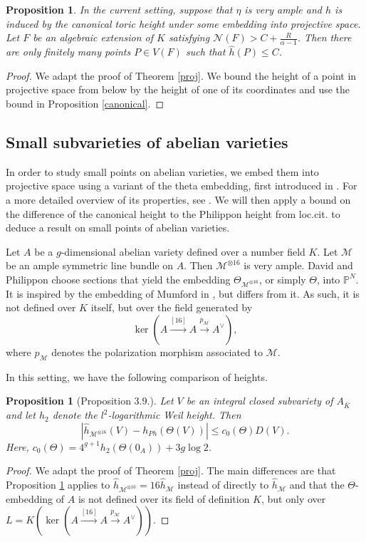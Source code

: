 \documentclass[11pt, a4paper, UKenglish]{amsart}
\newcommand{\N}{\mathcal N}
\newcommand{\sM}{\mathcal{M}}
\newcommand{\bbP}{\mathbb{P}}
\newcommand{\eqn}[1]{\begin{equation*}#1\end{equation*}}
\newtheorem{prop_}[thm_]{Proposition}
\theoremstyle{definition}
\newcommand{\prop}[1]{\begin{prop_}#1\end{prop_}}
\newcommand{\pf}[1]{\begin{proof}#1\end{proof}}
\begin{document}
\prop{In the current setting, suppose that $\eta$ is very ample and $h$ is induced by the canonical toric height under some embedding into projective space. Let $F$ be an algebraic extension of $K$ satisfying $\N(F) > C + \frac{R}{\alpha - 1}$. Then there are only finitely many points $P \in V(F)$ such that $\hat{h}(P) \leq C$.
}

\pf{We adapt the proof of Theorem \ref{proj}. We bound the height of a point in projective space from below by the height of one of its coordinates and use the bound in Proposition \ref{canonical}.}


\subsection{Small subvarieties of abelian varieties}

In order to study small points on abelian varieties, we embed them into projective space using a variant of the theta embedding, first introduced in \cite{mumford}. For a more detailed overview of its properties, see \cite{subvar}. We will then apply a bound on the difference of the canonical height to the Philippon height from loc.cit. to deduce a result on small points of abelian varieties.

Let $A$ be a $g$-dimensional abelian variety defined over a number field $K$. Let $\sM$ be an ample symmetric line bundle on $A$. Then $\sM^{\otimes 16}$ is very ample. David and Philippon choose sections that yield the embedding $\Theta_{\sM^{\otimes 16}}$, or simply $\Theta$, into $\bbP^N$. It is inspired by the embedding of Mumford in \cite{mumford}, but differs from it. As such, it is not defined over $K$ itself, but over the field generated by 
\eqn{\ker\left( A \xrightarrow{[16]}A \xrightarrow{p_{\sM}} A^{\vee}\right),}
where $p_{\sM}$ denotes the polarization morphism associated to $\sM$.

In this setting, we have the following comparison of heights.


\prop{[\cite{subvar}Proposition 3.9.]\label{comp1}Let $V$ be an integral closed subvariety of $A_{\bar{K}}$ and let $h_2$ denote the $l^2$-logarithmic Weil height. Then
\eqn{|\hat{h}_{\sM^{\otimes 16}}(V) - h_{Ph}(\Theta(V))| \leq c_0(\Theta)D(V).}
Here, $c_0(\Theta) = 4^{g+1}h_2(\Theta(0_A)) + 3g \log 2 $.
}

\abvar*

\pf{We adapt the proof of Theorem \ref{proj}. The main differences are that Proposition \ref{comp1} applies to $\hat{h}_{\sM^{\otimes 16}} = 16 \hat{h}_{\sM}$ instead of directly to $\hat{h}_{\sM}$ and that the $\Theta$-embedding of $A$ is not defined over its field of definition $K$, but only over $L = K\left(\ker\left( A \xrightarrow{[16]}A \xrightarrow{p_{\sM}} A^{\vee}\right)\right)$.}
\end{document}
